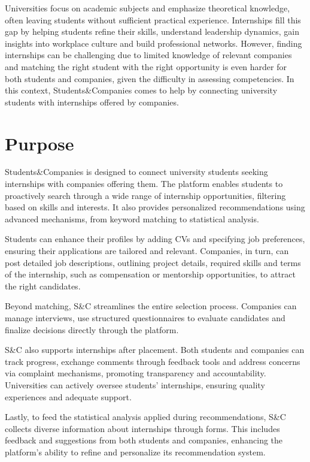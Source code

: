 Universities focus on academic subjects and emphasize theoretical knowledge, often leaving students without sufficient practical experience.
Internships fill this gap by helping students refine their skills, understand leadership dynamics, gain insights into workplace culture and build professional networks.
However, finding internships can be challenging due to limited knowledge of relevant companies and matching the right student with the right opportunity is even harder for both students and companies, given the difficulty in assessing competencies.
In this context, Students\&Companies comes to help by connecting university students with internships offered by companies.

\section{Purpose}
Students\&Companies is designed to connect university students seeking internships with companies offering them.
The platform enables students to proactively search through a wide range of internship opportunities, filtering based on skills and interests.
It also provides personalized recommendations using advanced mechanisms, from keyword matching to statistical analysis.

Students can enhance their profiles by adding CVs and specifying job preferences, ensuring their applications are tailored and relevant.
Companies, in turn, can post detailed job descriptions, outlining project details, required skills and terms of the internship, such as compensation or mentorship opportunities, to attract the right candidates.

Beyond matching, S\&C streamlines the entire selection process.
Companies can manage interviews, use structured questionnaires to evaluate candidates and finalize decisions directly through the platform. 

S\&C also supports internships after placement.
Both students and companies can track progress, exchange comments through feedback tools and address concerns via complaint mechanisms, promoting transparency and accountability.
Universities can actively oversee students' internships, ensuring quality experiences and adequate support.

Lastly, to feed the statistical analysis applied during recommendations, S\&C collects diverse information about internships through forms. This includes feedback and suggestions from both students and companies, enhancing the platform's ability to refine and personalize its recommendation system.


